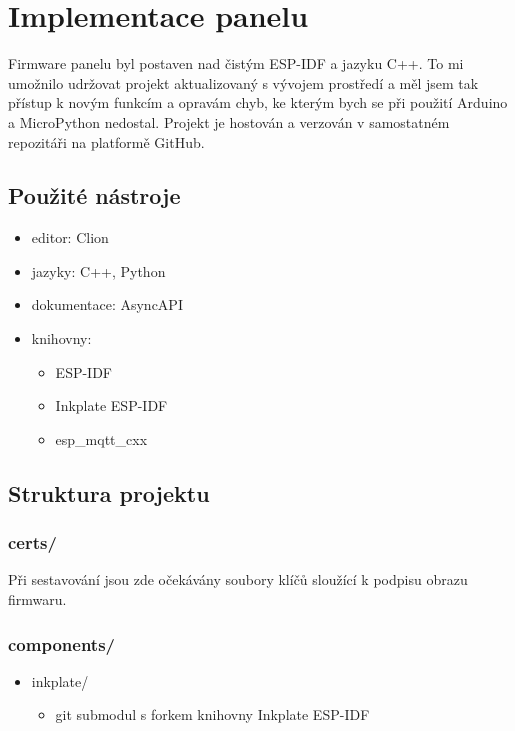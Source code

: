 \section{Implementace panelu}
Firmware panelu byl postaven nad čistým ESP-IDF a jazyku C++. To mi umožnilo udržovat projekt aktualizovaný s vývojem prostředí a měl jsem tak přístup k novým funkcím a opravám chyb, ke kterým bych se při použití Arduino a MicroPython nedostal. Projekt je hostován a verzován v samostatném repozitáři na platformě GitHub.

\subsection{Použité nástroje}
\begin{itemize}
    \item editor: Clion
    \item jazyky: C++, Python
    \item dokumentace: AsyncAPI
    \item knihovny:
        \begin{itemize}
            \item ESP-IDF
            \item Inkplate ESP-IDF
            \item esp\_mqtt\_cxx
        \end{itemize}
\end{itemize}

\subsection{Struktura projektu}
\subsubsection*{certs/}
Při sestavování jsou zde očekávány soubory klíčů sloužící k podpisu obrazu firmwaru.

\subsubsection*{components/}
\begin{itemize}
    \item inkplate/
    \begin{itemize}
        \item git submodul s forkem knihovny Inkplate ESP-IDF
    \end{itemize}
\end{itemize}

